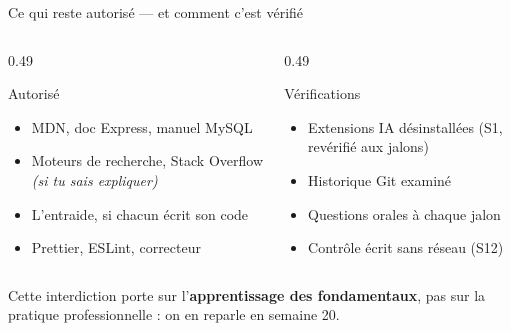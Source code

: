 \documentclass[aspectratio=169,11pt]{beamer}
\begin{document}
\begin{frame}{Ce qui reste autorisé --- et comment c'est vérifié}
  \begin{columns}[T]
    \begin{column}{0.49\textwidth}
      \begin{exampleblock}{Autorisé}
        \begin{itemize}
          \item MDN, doc Express, manuel MySQL
          \item Moteurs de recherche, Stack Overflow \textit{(si tu sais expliquer)}
          \item L'entraide, si chacun écrit son code
          \item Prettier, ESLint, correcteur
        \end{itemize}
      \end{exampleblock}
    \end{column}
    \begin{column}{0.49\textwidth}
      \begin{alertblock}{Vérifications}
        \begin{itemize}
          \item Extensions IA désinstallées (S1, revérifié aux jalons)
          \item Historique Git examiné
          \item Questions orales à chaque jalon
          \item Contrôle écrit sans réseau (S12)
        \end{itemize}
      \end{alertblock}
    \end{column}
  \end{columns}
  \vspace{0.3cm}
  \begin{center}
    \small Cette interdiction porte sur l'\textbf{apprentissage des fondamentaux}, pas sur la pratique professionnelle : on en reparle en semaine 20.
  \end{center}
\end{frame}
\end{document}
